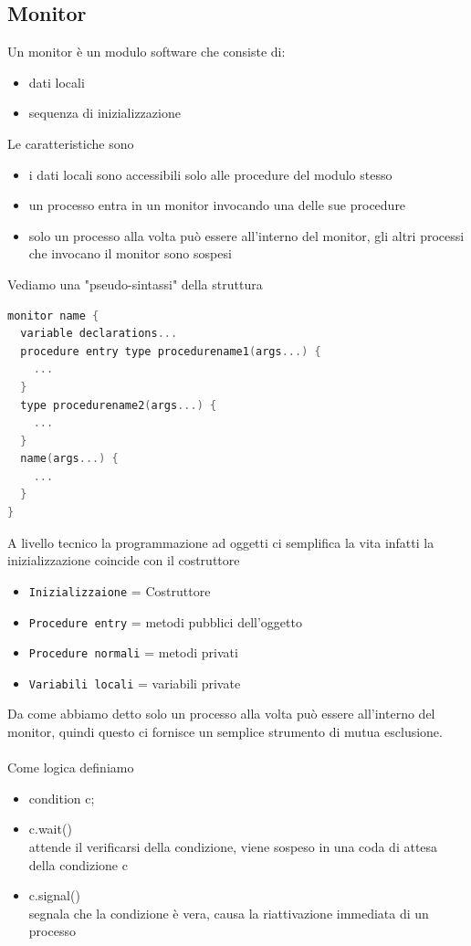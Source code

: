 \documentclass[a4paper,12pt]{article}
\begin{document}
\subsection{Monitor}
Un monitor è un modulo software che consiste di:
\begin{itemize}
  \item dati locali
  \item sequenza di inizializzazione
\end{itemize}
Le caratteristiche sono
\begin{itemize}
  \item i dati locali sono accessibili solo alle procedure del modulo stesso
  \item un processo entra in un monitor invocando una delle sue procedure
  \item solo un processo alla volta può essere all'interno del monitor, gli altri processi che invocano il monitor sono sospesi
\end{itemize}
Vediamo una "pseudo-sintassi" della struttura
\begin{lstlisting}[language=C]
monitor name {
  variable declarations...
  procedure entry type procedurename1(args...) {
    ...
  }
  type procedurename2(args...) {
    ...
  }
  name(args...) {
    ...
  }
}
\end{lstlisting}
A livello tecnico la programmazione ad oggetti ci semplifica la vita 
infatti la inizializzazione coincide con il costruttore
\begin{itemize}
  \item \texttt{Inizializzaione} = Costruttore
  \item \texttt{Procedure entry} = metodi pubblici dell'oggetto
  \item \texttt{Procedure normali} = metodi privati
  \item \texttt{Variabili locali} = variabili private 
\end{itemize}
Da come abbiamo detto solo un processo alla volta può essere all'interno del monitor, quindi questo ci fornisce un semplice strumento di mutua esclusione. \\
\vspace{5px} \\
Come logica definiamo
\begin{itemize}
  \item condition c;
  \item c.wait() \\
  attende il verificarsi della condizione, viene sospeso in una coda di attesa della condizione c
  \item c.signal() \\
  segnala che la condizione è vera, causa la riattivazione immediata di un processo
\end{itemize}
\end{document}
